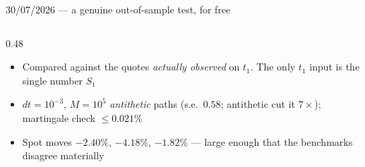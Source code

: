 \documentclass[aspectratio=169,11pt]{beamer}
\newcommand{\red}[1]{{\color{ntured}#1}}
\begin{document}
\begin{frame}[shrink=10]{30/07/2026 --- a genuine out-of-sample test, for free}
\begin{columns}[T]
\begin{column}{0.48\linewidth}
      \begin{itemize}\scriptsize
        \item Compared against the quotes \emph{actually observed} on $t_1$.
              \red{The only $t_1$ input is the single number $S_1$}
        \item $dt=10^{-3}$, $M=10^5$ \emph{antithetic} paths (s.e.\ $0.58$; antithetic cut
              it $7\times$); martingale check $\le0.021\%$
        \item Spot moves $-2.40\%$, $-4.18\%$, $-1.82\%$ --- large enough that the
              benchmarks disagree materially
      \end{itemize}
    \end{column}
  \end{columns}
\end{frame}

\end{document}
